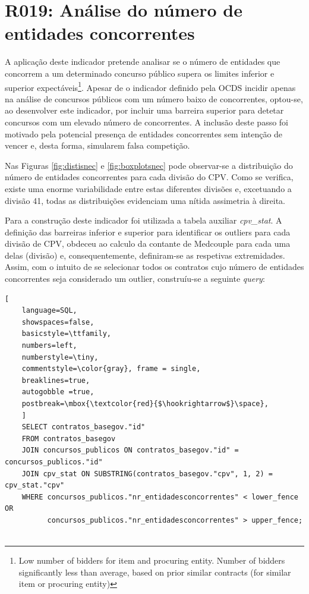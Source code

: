 \section{R019: Análise do número de entidades concorrentes}

A aplicação deste indicador pretende analisar se o número de entidades que concorrem a um determinado concurso público supera os limites inferior e superior expectáveis\footnote{Low number of bidders for item and procuring entity. Number of bidders significantly less than average, based on prior similar contracts (for similar item or procuring entity)}. Apesar de o indicador definido pela OCDS incidir apenas na análise de concursos públicos com um número baixo de concorrentes, optou-se, ao desenvolver este indicador, por incluir uma barreira superior para detetar concursos com um elevado número de concorrentes. A inclusão deste passo foi motivado pela potencial presença de entidades concorrentes sem intenção de vencer e, desta forma, simularem falsa competição.


Nas Figuras \ref{fig:distisnec} e \ref{fig:boxplotsnec} pode observar-se a distribuição do número de entidades concorrentes para cada divisão do CPV. Como se verifica, existe uma enorme variabilidade entre estas diferentes divisões e, excetuando a divisão 41, todas as distribuições evidenciam uma nítida assimetria à direita.


Para a construção deste indicador foi utilizada a tabela auxiliar \textit{cpv\_stat}. A definição das barreiras inferior e superior para identificar os outliers para cada divisão de CPV, obdeceu ao calculo da contante de Medcouple para cada uma delas (divisão) e, consequentemente, definiram-se as respetivas extremidades. Assim, com o intuito de se  selecionar todos os contratos cujo número de entidades concorrentes seja considerado um outlier, construíu-se a seguinte \textit{query}: 

\begin{lstlisting}[
	language=SQL,
	showspaces=false,
	basicstyle=\ttfamily,
	numbers=left,
	numberstyle=\tiny,
	commentstyle=\color{gray}, frame = single,
	breaklines=true,
	autogobble =true,
	postbreak=\mbox{\textcolor{red}{$\hookrightarrow$}\space},
	]
	SELECT contratos_basegov."id"
	FROM contratos_basegov 
	JOIN concursos_publicos ON contratos_basegov."id" = concursos_publicos."id"
	JOIN cpv_stat ON SUBSTRING(contratos_basegov."cpv", 1, 2) = cpv_stat."cpv"
	WHERE concursos_publicos."nr_entidadesconcorrentes" < lower_fence OR
		  concursos_publicos."nr_entidadesconcorrentes" > upper_fence;
	
\end{lstlisting}


